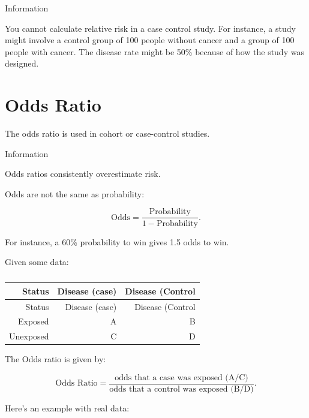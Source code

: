 \documentclass[
]{book}
\begin{document}
Information

You cannot calculate relative risk in a case control study. For instance, a study might involve a control group of 100 people without cancer and a group of 100 people with cancer. The disease rate might be 50\% because of how the study was designed.

\hypertarget{odds-ratio}{%
\section{Odds Ratio}\label{odds-ratio}}

The odds ratio is used in cohort or case-control studies.

Information

Odds ratios consistently overestimate risk.

Odds are not the same as probability:

\[\textrm{Odds}=\frac{\textrm{Probability}}{1-\textrm{Probability}}.\]

For instance, a 60\% probability to win gives 1.5 odds to win.

Given some data:

\begin{longtable}[]{@{}rrr@{}}
\caption{\label{tab:table16}}\tabularnewline
\toprule
Status & Disease (case) & Disease (Control \\
\midrule
\endfirsthead
\toprule
Status & Disease (case) & Disease (Control \\
\midrule
\endhead
Exposed & A & B \\
Unexposed & C & D \\
\bottomrule
\end{longtable}

The Odds ratio is given by:

\[\textrm{Odds Ratio} = \frac{\textrm{odds that a case was exposed (A/C)}}{\textrm{odds that a control was exposed (B/D)}}.\]

Here's an example with real data:
\end{document}
